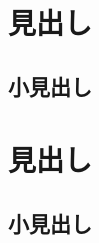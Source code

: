 \documentclass{jsarticle}
\begin{document}
\title{}
\date{\today}
\author{your name}
\maketitle

\section{見出し}
\subsection{小見出し}
\section{見出し}
\subsection{小見出し}
\end{document}
